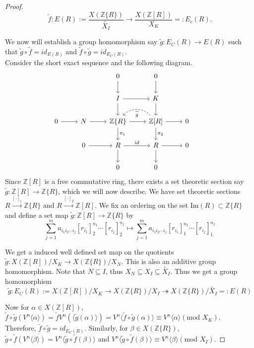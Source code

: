 \documentclass[11pt]{amsart}
\theoremstyle{plain}
\theoremstyle{definition}
\renewcommand{\tilde}{\widetilde}
\newcommand{\Z}{{\mathbb Z}}
\newcommand{\ab}[1]{\langle {#1} \rangle}
\newcommand{\ac}[1]{\{#1\}}
\begin{document}
\begin{proof}
$$\tilde{f}: E(R):=\frac{X(\Z\ac{R})}{\tilde{X_I} }\longrightarrow  \frac{X(\Z[R])}{X_K} =: E_c(R).$$

 We now will establish a group homomorphism say $\tilde{g} : E_C(R) \to E(R)$ such that $\tilde{g} \circ \tilde{f} = id_{E(R)}$ and $\tilde{f} \circ \tilde{g} = id_{E_C(R)}$.\\

Consider the short exact sequence and the following diagram. 
\[\begin{tikzcd}
     &                 &    0\arrow[d]   &  0 \arrow[d] &         & \\
    &                 &  I \arrow[d] \arrow[r] &   K\arrow[d]       &               & \\
0 \arrow[r] & N \arrow[r] & \Z\{R\} \arrow[r]\arrow[d, "\pi_1"]  & \Z[R] \arrow[r]\arrow[d, "\pi_2"] \arrow[l, "\tilde{g}", dashed, bend right=49] & 0 \\
 & 0  \arrow[r]    & R \arrow[r, "id"]\arrow[d] & R \arrow[r]\arrow[d] & 0 \\
  &  & 0 & 0 & 
\end{tikzcd}\]
Since $\Z[R]$ is a free commutative ring, there exists a set theoretic section say $\tilde{g}: \Z[R] \to \Z\{R\}$, which we will now describe. We have set theoretic sections $R \stackrel{[\cdot]_1}{\longrightarrow} \Z\{R\}$ and $R \stackrel{[\cdot]_2}{\longrightarrow} \Z[R]$. We fix an ordering on the set $\text{Im}(R) \subset \Z\{R\}$ and define a set map $\tilde{g} : \Z[R] \to \Z\{R\}$  by 
$$\sum_{j=1}^m a_{i_1i_2\cdots i_j}[r_{i_1}]_2^{n_1}\cdots [r_{i_j}]_2^{n_j} \mapsto \sum_{j=1}^m a_{i_1i_2\cdots i_j}[r_{i_1}]_1^{n_1}\cdots [r_{i_j}]_1^{n_j}$$
 
 \noindent We get a induced well defined set map on the quotients $\tilde{g}: X(\Z[R])/X_K \to X(\Z\{R\})/X_N$. This is also an additive group homomorphism. Note that $N \subseteq I$, thus $X_N \subseteq X_I \subseteq \tilde{X_I}$. Thus we get a group homomorphism
  $$\tilde{g}: E_C(R) := X(\Z[R])/X_K \longrightarrow X(\Z\{R\})/X_I \twoheadrightarrow X(\Z\{R\})/\tilde{X_I} =: E(R)$$


\noindent Now for $\alpha \in X(\Z[R])$, $\tilde{f} \circ \tilde{g}(V^n\ab{\alpha})= \tilde{f}V^n(\ab{\tilde{g}(\alpha)}) = V^n\ab{\tilde{f}\circ \tilde{g}(\alpha)} \equiv V^n\ab{\alpha} (\text{mod } X_K )$. \\ 
\noindent Therefore,  $\tilde{f} \circ \tilde{g} = id_{E_C(R)}$. Similarly, for $\beta \in X(\Z\{R\})$, $\tilde{g} \circ \tilde{f}(V^n\ab{\beta}) = V^n\ab{\tilde{g}\circ\tilde{f}(\beta)}$ and $V^n\ab{\tilde{g}\circ\tilde{f}(\beta)} \equiv V^n\ab{\beta}(\text{mod } X_I )$.
\end{proof}
\end{document}
